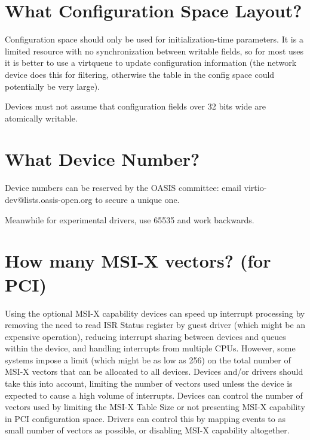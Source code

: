 \section{What Configuration Space Layout?}\label{sec:Creating New Device Types / What Configuration Space Layout?}

Configuration space should only be used for initialization-time
parameters.  It is a limited resource with no synchronization between
writable fields, so for most uses it is better to use a virtqueue to update
configuration information (the network device does this for filtering,
otherwise the table in the config space could potentially be very
large).

Devices must not assume that configuration fields over 32 bits wide
are atomically writable.

\section{What Device Number?}\label{sec:Creating New Device Types / What Device Number?}

Device numbers can be reserved by the OASIS committee: email
virtio-dev@lists.oasis-open.org to secure a unique one.

Meanwhile for experimental drivers, use 65535 and work backwards.

\section{How many MSI-X vectors?  (for PCI)}\label{sec:Creating New Device Types / How many MSI-X vectors?  (for PCI)}

Using the optional MSI-X capability devices can speed up
interrupt processing by removing the need to read ISR Status
register by guest driver (which might be an expensive operation),
reducing interrupt sharing between devices and queues within the
device, and handling interrupts from multiple CPUs. However, some
systems impose a limit (which might be as low as 256) on the
total number of MSI-X vectors that can be allocated to all
devices. Devices and/or drivers should take this into
account, limiting the number of vectors used unless the device is
expected to cause a high volume of interrupts. Devices can
control the number of vectors used by limiting the MSI-X Table
Size or not presenting MSI-X capability in PCI configuration
space. Drivers can control this by mapping events to as small
number of vectors as possible, or disabling MSI-X capability
altogether.

